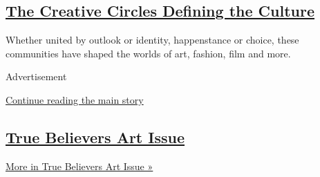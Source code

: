 \begin{enumerate}
  \hypertarget{the-creative-circles-defining-the-culture}{%
  \subsection{\texorpdfstring{\href{/interactive/2020/04/13/t-magazine/culture-issue-2020.html}{The
  Creative Circles Defining the
  Culture}}{The Creative Circles Defining the Culture}}\label{the-creative-circles-defining-the-culture}}

  Whether united by outlook or identity, happenstance or choice, these
  communities have shaped the worlds of art, fashion, film and more.
\end{enumerate}

Advertisement

\protect\hyperlink{after-mid1}{Continue reading the main story}

\hypertarget{true-believers-art-issue}{%
\subsection{\texorpdfstring{\href{/issue/t-magazine/2020/07/02/true-believers-art-issue}{True
Believers Art
Issue}}{True Believers Art Issue}}\label{true-believers-art-issue}}

\href{/issue/t-magazine/2020/07/02/true-believers-art-issue}{More in
True Believers Art Issue »}


